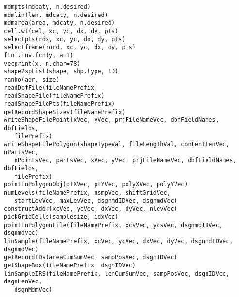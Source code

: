 \begin{Usage}
\begin{verbatim}
mdmpts(mdcaty, n.desired)
mdmlin(len, mdcaty, n.desired)
mdmarea(area, mdcaty, n.desired)
cell.wt(cel, xc, yc, dx, dy, pts)
selectpts(rdx, xc, yc, dx, dy, pts)
selectframe(rord, xc, yc, dx, dy, pts)
ftnt.inv.fcn(y, a=1)
vecprint(x, n.char=78)
shape2spList(shape, shp.type, ID)
ranho(adr, size)
readDbfFile(fileNamePrefix)
readShapeFile(fileNamePrefix)
readShapeFilePts(fileNamePrefix)
getRecordShapeSizes(fileNamePrefix)
writeShapeFilePoint(xVec, yVec, prjFileNameVec, dbfFieldNames, dbfFields,
   filePrefix)
writeShapeFilePolygon(shapeTypeVal, fileLengthVal, contentLenVec, nPartsVec,
   nPointsVec, partsVec, xVec, yVec, prjFileNameVec, dbfFieldNames, dbfFields,
   filePrefix)
pointInPolygonObj(ptXVec, ptYVec, polyXVec, polyYVec)
numLevels(fileNamePrefix, nsmpVec, shiftGridVec,
   startLevVec, maxLevVec, dsgnmdIDVec, dsgnmdVec)
constructAddr(xcVec, ycVec, dxVec, dyVec, nlevVec)
pickGridCells(samplesize, idxVec)
pointInPolygonFile(fileNamePrefix, xcsVec, ycsVec, dsgnmdIDVec, dsgnmdVec)
linSample(fileNamePrefix, xcVec, ycVec, dxVec, dyVec, dsgnmdIDVec, dsgnmdVec)
getRecordIDs(areaCumSumVec, sampPosVec, dsgnIDVec)
getShapeBox(fileNamePrefix, dsgnIDVec)
linSampleIRS(fileNamePrefix, lenCumSumVec, sampPosVec, dsgnIDVec, dsgnLenVec,
   dsgnMdmVec)


\end{verbatim}
\end{Usage}
